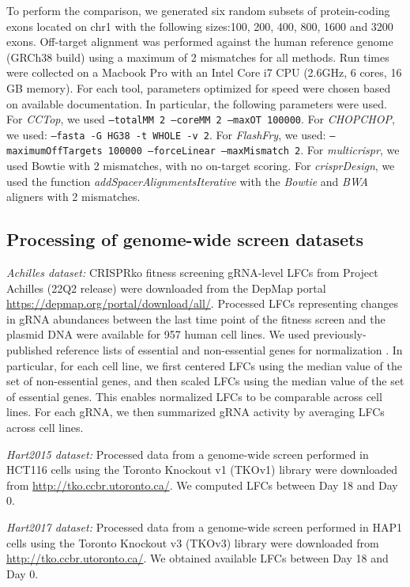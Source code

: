 \documentclass[pdftex,english,10pt]{article}
\begin{document}
{To perform the comparison, we generated six random subsets of protein-coding exons located on chr1 with the following sizes:100, 200, 400, 800, 1600 and 3200 exons.
Off-target alignment was performed against the human reference genome (GRCh38 build) using a maximum of 2 mismatches for all methods.  Run times were collected on a Macbook Pro with an Intel Core i7 CPU (2.6GHz, 6 cores, 16 GB memory). For each tool, parameters optimized for speed were chosen based on available documentation. In particular, the following parameters were used. For \textit{CCTop}, we used \texttt{--totalMM 2 --coreMM 2 --maxOT 100000}. For \textit{CHOPCHOP}, we used: \texttt{--fasta -G HG38 -t WHOLE -v 2}. For \textit{FlashFry}, we used: \texttt{--maximumOffTargets 100000 --forceLinear --maxMismatch 2}. For \textit{multicrispr}, we used Bowtie with 2 mismatches, with no on-target scoring. For \textit{crisprDesign}, we used the function \textit{addSpacerAlignmentsIterative} with the \textit{Bowtie} and \textit{BWA} aligners with 2 mismatches. 




\subsection*{Processing of genome-wide screen datasets}

\textit{Achilles dataset:} CRISPRko fitness screening gRNA-level LFCs from Project Achilles (22Q2 release) were downloaded from the DepMap portal \url{https://depmap.org/portal/download/all/}. Processed LFCs representing changes in gRNA abundances between the last time point of the fitness screen and the plasmid DNA were available for 957 human cell lines. We used previously-published reference lists of essential and non-essential genes for normalization \citep{hart2014}.
In particular, for each cell line, we first centered LFCs using the median value of the set of non-essential genes, and then scaled LFCs using the median value of the set of essential genes. This enables normalized LFCs to be comparable across cell lines. For each gRNA, we then summarized gRNA activity by averaging LFCs across cell lines. 

\textit{Hart2015 dataset:} Processed data from a genome-wide screen performed in HCT116 cells  using the Toronto Knockout v1 (TKOv1) library \citep{toronto1} were downloaded from \url{http://tko.ccbr.utoronto.ca/}. We computed LFCs between Day 18 and Day 0. 

\textit{Hart2017 dataset:} Processed data from a genome-wide screen performed in HAP1 cells using the Toronto Knockout v3 (TKOv3) library \citep{toronto3} were downloaded from \url{http://tko.ccbr.utoronto.ca/}. We obtained available LFCs between Day 18 and Day 0.

}
\end{document}
